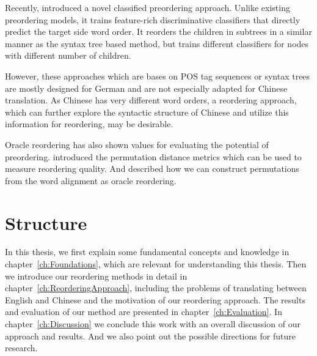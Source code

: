 Recently, \cite{google} introduced a novel classified preordering approach. Unlike existing preordering models, it trains feature-rich discriminative classifiers that directly predict the target side word order. It reorders the children in subtrees in a similar manner as the syntax tree based method, but trains different classifiers for nodes with different number of children.

However, these approaches which are bases on POS tag sequences or syntax trees are mostly designed for German and are not especially adapted for Chinese translation. As Chinese has very different word orders, a reordering approach, which can further explore the syntactic structure of Chinese and utilize this information for reordering, may be desirable.

Oracle reordering has also shown values for evaluating the potential of preordering. \cite{metrics} introduced the permutation distance metrics which can be used to measure reordering quality. And \cite{birch2} described how we can construct permutations from the word alignment as oracle reordering.

\section{Structure}
\label{ch:Introduction:sec:Structure}

In this thesis, we first explain some fundamental concepts and knowledge in chapter~\ref{ch:Foundations}, which are relevant for understanding this thesis. Then we introduce our reordering methods in detail in chapter~\ref{ch:ReorderingApproach}, including the problems of translating between English and Chinese and the motivation of our reordering approach. The results and evaluation of our method are presented in chapter~\ref{ch:Evaluation}. In chapter~\ref{ch:Discussion} we conclude this work with an overall discussion of our approach and results. And we also point out the possible directions for future research.